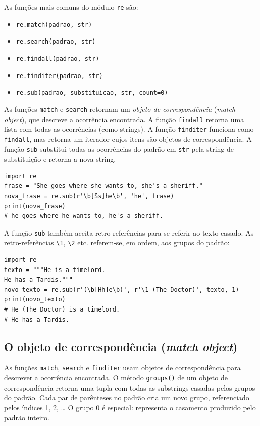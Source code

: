 \documentclass[11pt,a4paper]{article}
\begin{document}
As funções mais comuns do módulo \texttt{re} são:

\begin{itemize}
\item \texttt{re.match(padrao, str)}
\item \texttt{re.search(padrao, str)}
\item \texttt{re.findall(padrao, str)}
\item \texttt{re.finditer(padrao, str)}
\item \texttt{re.sub(padrao, substituicao, str, count=0)}
\end{itemize}

As funções \texttt{match} e \texttt{search} retornam um \emph{objeto de
correspondência} (\emph{match object}), que descreve a ocorrência
encontrada. A função \texttt{findall} retorna uma lista com todas as
ocorrências (como strings). A função \texttt{finditer} funciona como
\texttt{findall}, mas retorna um iterador cujos itens são objetos de
correspondência. A função \texttt{sub} substitui todas as ocorrências do
padrão em \texttt{str} pela string de substituição e retorna a nova
string.

\begin{lstlisting}
import re
frase = "She goes where she wants to, she's a sheriff."
nova_frase = re.sub(r'\b[Ss]he\b', 'he', frase)
print(nova_frase)
# he goes where he wants to, he's a sheriff.
\end{lstlisting}

A função \texttt{sub} também aceita retro-referências para se referir ao
texto casado. As retro-referências \texttt{\textbackslash 1},
\texttt{\textbackslash 2} etc. referem-se, em ordem, aos grupos do
padrão:

\begin{lstlisting}
import re
texto = """He is a timelord.
He has a Tardis."""
novo_texto = re.sub(r'(\b[Hh]e\b)', r'\1 (The Doctor)', texto, 1)
print(novo_texto)
# He (The Doctor) is a timelord.
# He has a Tardis.
\end{lstlisting}

\subsection{O objeto de correspondência (\emph{match object})}

As funções \texttt{match}, \texttt{search} e \texttt{finditer} usam
objetos de correspondência para descrever a ocorrência encontrada. O
método \texttt{groups()} de um objeto de correspondência retorna uma
tupla com todas as substrings casadas pelos grupos do padrão. Cada par de
parênteses no padrão cria um novo grupo, referenciado pelos índices 1, 2,
\dots{} O grupo 0 é especial: representa o casamento produzido pelo
padrão inteiro.
\end{document}
